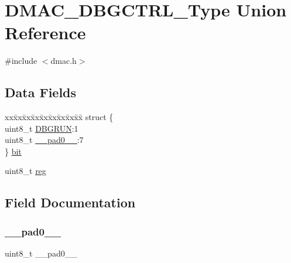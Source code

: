 \hypertarget{union_d_m_a_c___d_b_g_c_t_r_l___type}{}\section{D\+M\+A\+C\+\_\+\+D\+B\+G\+C\+T\+R\+L\+\_\+\+Type Union Reference}
\label{union_d_m_a_c___d_b_g_c_t_r_l___type}


{\ttfamily \#include $<$dmac.\+h$>$}

\subsection*{Data Fields}
\begin{DoxyCompactItemize}
\item 
\begin{tabbing}
xx\=xx\=xx\=xx\=xx\=xx\=xx\=xx\=xx\=\kill
struct \{\\
\>uint8\_t \mbox{\hyperlink{union_d_m_a_c___d_b_g_c_t_r_l___type_a1e1cc79f6834369b9dd0c6676a0d8781}{DBGRUN}}:1\\
\>uint8\_t \mbox{\hyperlink{union_d_m_a_c___d_b_g_c_t_r_l___type_a8b4eebe79ded0459acec2f4950102ba3}{\_\_pad0\_\_}}:7\\
\} \mbox{\hyperlink{union_d_m_a_c___d_b_g_c_t_r_l___type_a5f2b1ec0da0c69e8a766987d8741e5af}{bit}}\\

\end{tabbing}\item 
uint8\+\_\+t \mbox{\hyperlink{union_d_m_a_c___d_b_g_c_t_r_l___type_a9428adc9af4653a2050e2536b55dec8d}{reg}}
\end{DoxyCompactItemize}


\subsection{Field Documentation}
\mbox{\label{union_d_m_a_c___d_b_g_c_t_r_l___type_a8b4eebe79ded0459acec2f4950102ba3}} 
\subsubsection{\texorpdfstring{\_\_pad0\_\_}{\_\_pad0\_\_}}
{\footnotesize\ttfamily uint8\+\_\+t \+\_\+\+\_\+pad0\+\_\+\+\_\+}

